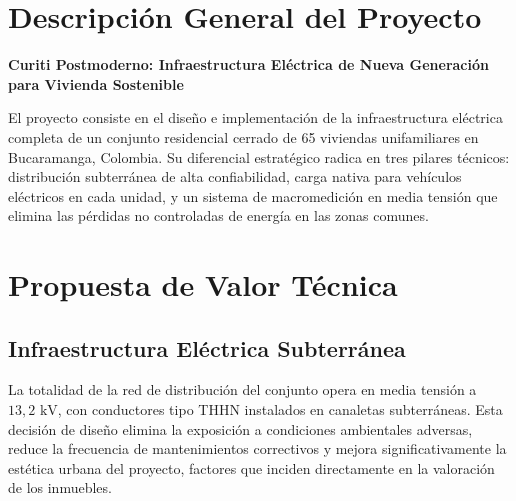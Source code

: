 
\section{Descripci\'on General del Proyecto}

\begin{darkbox}
  {\large\bfseries\color{GoldAccent}
    Curiti Postmoderno: Infraestructura El\'ectrica de Nueva
    Generaci\'on para Vivienda Sostenible\par}
  \vspace{6pt}
  El proyecto consiste en el dise\~no e implementaci\'on de la
  infraestructura el\'ectrica completa de un conjunto residencial
  cerrado de 65 viviendas unifamiliares en Bucaramanga, Colombia.
  Su diferencial estrat\'egico radica en tres pilares t\'ecnicos:
  distribuci\'on subterr\'anea de alta confiabilidad, carga nativa
  para veh\'iculos el\'ectricos en cada unidad, y un sistema de
  macromedici\'on en media tensi\'on que elimina las p\'erdidas
  no controladas de energ\'ia en las zonas comunes.
\end{darkbox}

\vspace{10pt}

\section{Propuesta de Valor T\'ecnica}

\subsection{Infraestructura El\'ectrica Subterr\'anea}

La totalidad de la red de distribuci\'on del conjunto opera en
media tensi\'on a $13{,}2\text{ kV}$, con conductores tipo THHN
instalados en canaletas subterr\'aneas. Esta decisi\'on de dise\~no
elimina la exposici\'on a condiciones ambientales adversas, reduce
la frecuencia de mantenimientos correctivos y mejora
significativamente la est\'etica urbana del proyecto,
factores que inciden directamente en la valoraci\'on de los
inmuebles.

